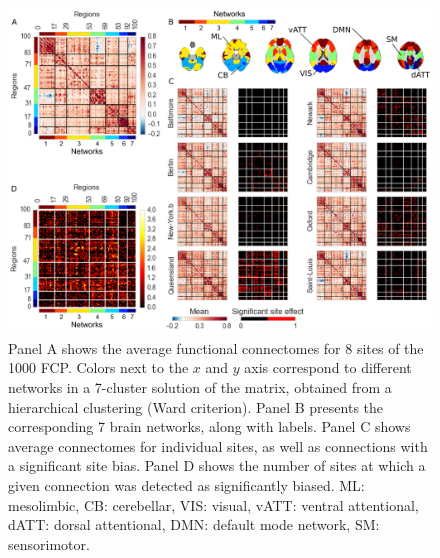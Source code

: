 \documentclass[authoryear]{elsarticle}
\begin{document}
\begin{figure}[htbp]
\begin{center}
\includegraphics[width=\linewidth]{../figures/connectome_multisite.png}
\end{center}
\caption[Connectome variability across sites]{
Panel A shows the average functional connectomes for 8 sites of the 1000 FCP. Colors next to the $x$ and $y$ axis correspond to different networks in a 7-cluster solution of the matrix, obtained from a hierarchical clustering (Ward criterion). Panel B presents the corresponding 7 brain networks, along with labels. Panel C shows average connectomes for individual sites, as well as connections with a significant site bias. Panel D shows the number of sites at which a given connection was detected as significantly biased. ML: mesolimbic, CB: cerebellar, VIS: visual, vATT: ventral attentional, dATT: dorsal attentional, DMN: default mode network, SM: sensorimotor.
}
\label{fig_connectome_variability}
\end{figure}
\end{document}
